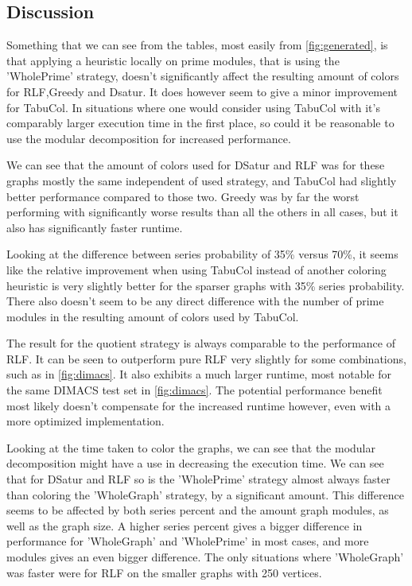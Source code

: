\documentclass[a4paper]{article}
\begin{document}
\FloatBarrier
\subsection{Discussion}

Something that we can see from the tables, most easily from
\autoref{fig:generated}, is that applying a heuristic locally on prime modules,
that is using the 'WholePrime' strategy,
doesn't significantly affect the resulting amount of colors for RLF,Greedy and Dsatur. It
does however seem to give a minor improvement for TabuCol. In situations where
one would consider using TabuCol with it's comparably larger execution time in
the first place, so could it be reasonable to use the modular decomposition for
increased performance.

We can see that the amount of  colors used for DSatur and RLF was for these
graphs mostly the same independent of used strategy, and TabuCol had slightly better performance compared to
those two. Greedy was by far the worst performing with significantly worse
results than all the others in all cases, but it also has significantly faster runtime.

Looking at the difference between series probability of 35\% versus 70\%, it
seems like the relative improvement when using TabuCol instead of another
coloring heuristic is very slightly better for the sparser
graphs with 35\% series probability. There also doesn't seem to be any direct
difference with the number of prime modules in the resulting amount of colors used by TabuCol.

The result for the quotient strategy is always comparable to the performance
of RLF. It can be seen to outperform pure RLF very slightly for some
combinations, such as in \autoref{fig:dimacs}. It also exhibits a much larger
runtime, most notable for the same DIMACS test set in \autoref{fig:dimacs}.  The
potential performance benefit most likely doesn't compensate for the increased
runtime however, even with a more optimized implementation.

Looking at the time taken to color the graphs, we can see that the modular
decomposition might have a use in decreasing the execution time.  We can see
that for DSatur and RLF so is the 'WholePrime' strategy almost always faster
than coloring the 'WholeGraph' strategy, by a significant amount. This difference seems to be affected
by both series percent and the amount graph modules, as well as the graph size.
A higher series percent gives a bigger difference in performance for
'WholeGraph' and 'WholePrime' in most cases, and more modules gives an even bigger
difference. The only situations where 'WholeGraph' was faster were for RLF on the smaller graphs 
with 250 vertices.
\end{document}
